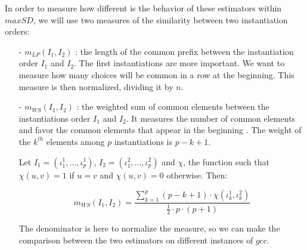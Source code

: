 \documentclass[jair,twoside,11pt,theapa]{article}
\begin{document}
In order to measure how different is the behavior of these estimators within $maxSD$, we will use two measures of the similarity between two instantiation orders:
\begin{itemize}
\item[-] $m_{LP}(I_1, I_2)$ : the length of the common prefix between the instantiation order $I_1$ and $I_2$. The first instantiations are more important. We want to measure how many choices will be common in a row at the beginning. This measure is then normalized, dividing it by $n$.

\item[-] $m_{WS}(I_1, I_2)$ : the weighted sum of common elements between the instantiations order $I_1$ and $I_2$. It measures the number of common elements and favor the common elements that appear in the beginning . The weight of the $k^{th}$ elements among $p$ instantiations is $p-k+1$.

Let $I_1 = (\iota^1_1, \ldots, \iota^1_p)$, $I_2 = (\iota^2_1, \ldots, \iota^2_p)$ and $\chi$, the function such that $\chi(u,v)=1$ if $u=v$ and $\chi(u,v)=0$ otherwise. Then:

\begin{equation*}
	m_{WS}(I_1, I_2) = \frac{\sum_{k=1}^p (p-k+1)\cdot \chi(\iota^1_k, \iota^2_k)}{\frac{1}{2}\cdot p\cdot(p+1)}
\end{equation*}

The denominator is here to normalize the measure, so we can make the comparison between the two estimators on different instances of $gcc$.

\end{itemize}
\end{document}
